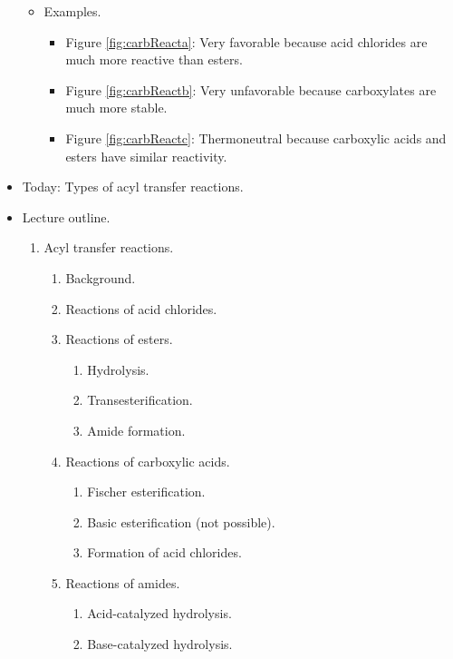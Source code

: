 \documentclass[../notes.tex]{subfiles}
\begin{document}
\begin{itemize}
\begin{itemize}
\begin{itemize}
        \end{itemize}
        \item Examples.
        \begin{itemize}
            \item Figure \ref{fig:carbReacta}: Very favorable because acid chlorides are much more reactive than esters.
            \item Figure \ref{fig:carbReactb}: Very unfavorable because carboxylates are much more stable.
            \item Figure \ref{fig:carbReactc}: Thermoneutral because carboxylic acids and esters have similar reactivity.
        \end{itemize}
    \end{itemize}
    \item Today: Types of acyl transfer reactions.
    \pagebreak
    \item Lecture outline.
    \begin{enumerate}[start=3]
        \item Acyl transfer reactions.
        \begin{enumerate}[label={\alph*.}]
            \item Background.
            \item Reactions of acid chlorides.
            \item Reactions of esters.
            \begin{enumerate}
                \item Hydrolysis.
                \item Transesterification.
                \item Amide formation.
            \end{enumerate}
            \item Reactions of carboxylic acids.
            \begin{enumerate}
                \item Fischer esterification.
                \item Basic esterification (not possible).
                \item Formation of acid chlorides.
            \end{enumerate}
            \item Reactions of amides.
            \begin{enumerate}
                \item Acid-catalyzed hydrolysis.
                \item Base-catalyzed hydrolysis.

\end{enumerate}
\end{enumerate}
\end{enumerate}
\end{itemize}
\end{document}

